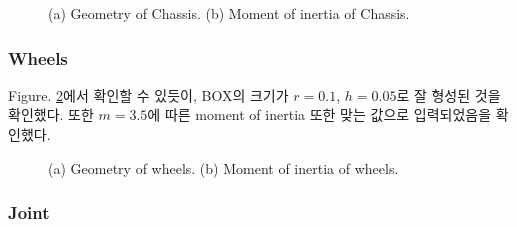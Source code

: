 \documentclass{article}
\begin{document}
\begin{figure}[h]
	\centering
	\caption{(a) Geometry of Chassis. (b) Moment of inertia of Chassis. }\label{fig:experimental_envorinment}
\end{figure}


\subsubsection{Wheels}

Figure. \ref{fig:wheel}에서 확인할 수 있듯이, BOX의 크기가 $r=0.1$, $h=0.05$로 잘 형성된 것을 확인했다. 또한 $m=3.5$에 따른 moment of inertia 또한 맞는 값으로 입력되었음을 확인했다.

\begin{figure}[h]
	\centering
	\caption{(a) Geometry of wheels. (b) Moment of inertia of wheels. }\label{fig:wheel}
\end{figure}


\subsubsection{Joint}
\end{document}
